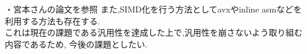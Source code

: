 ・宮本さんの論文を参照
また,SIMD化を行う方法としてavxやinline asmなどを利用する方法も存在する.\\
これは現在の課題である汎用性を達成した上で,汎用性を崩さないよう取り組む内容であるため,
今後の課題としたい.\\

